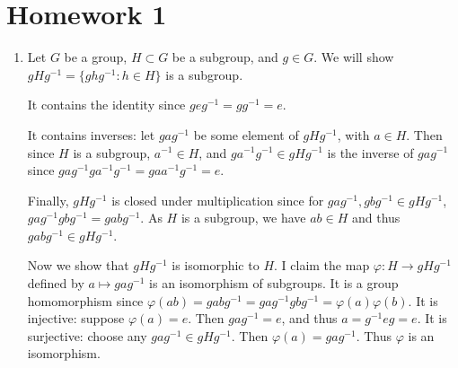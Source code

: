 \documentclass[11pt, reqno]{article}
\begin{document}
\topmargin=-40pt
\renewcommand{\headrulewidth}{1pt}
\renewcommand{\headsep}{20pt}
\thispagestyle{fancy}

\section*{Homework 1}

\begin{enumerate}
    \item Let $G$ be a group, $H \subset G$ be a subgroup, and $g \in G$. We will show
    $gHg^{-1} = \{ghg^{-1}: h \in H\}$ is a subgroup. 

    It contains the identity since $geg^{-1} = gg^{-1} = e$. 
    
    It contains inverses: let $gag^{-1}$
    be some element of $gHg^{-1}$, with $a \in H$. Then since $H$ is a subgroup, $a^{-1} \in H$, 
    and $ga^{-1}g^{-1} \in gHg^{-1}$ is the inverse of $gag^{-1}$ since $gag^{-1}ga^{-1}g^{-1}
    = gaa^{-1}g^{-1} = e$.

    Finally, $gHg^{-1}$ is closed under multiplication since for $gag^{-1}, gbg^{-1} \in gHg^{-1}$,
    $gag^{-1}gbg^{-1} = gabg^{-1}$. As $H$ is a subgroup, we have $ab \in H$ and thus $gabg^{-1} \in gHg^{-1}$.

    Now we show that $gHg^{-1}$ is isomorphic to $H$. I claim the map $\varphi: H \rightarrow gHg^{-1}$
    defined by $a \mapsto gag^{-1}$ is an isomorphism of subgroups. It is a group homomorphism
    since $\varphi(ab) = gabg^{-1} = gag^{-1}gbg^{-1} = \varphi(a)\varphi(b)$. It is injective: 
    suppose $\varphi(a) = e$. Then $gag^{-1} = e$, and thus $a = g^{-1}eg = e$. It is surjective: 
    choose any $gag^{-1} \in gHg^{-1}$. Then $\varphi(a) = gag^{-1}$. Thus $\varphi$ is an isomorphism.
    
\end{enumerate}
\end{document}
